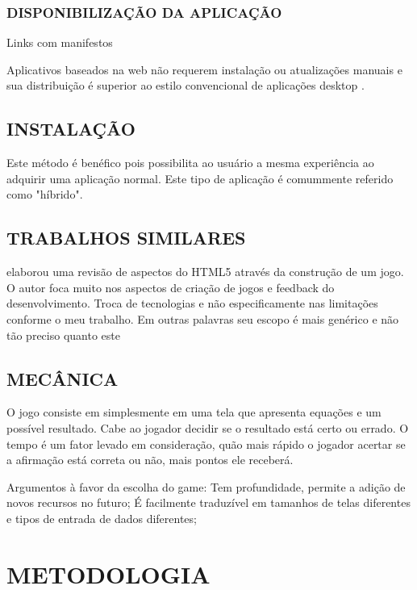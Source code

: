 \documentclass[
12pt,
a4paper,
portuges,
draft
]{report}
\begin{document}
\subsection{DISPONIBILIZAÇÃO DA APLICAÇÃO}

Links com manifestos

Aplicativos baseados na web não requerem instalação ou atualizações manuais e sua distribuição é superior ao estilo convencional de aplicações desktop \autocite{browserGamesTechnologyAndFuture}.

\section{INSTALAÇÃO}
Este método é benéfico pois possibilita ao usuário a mesma
experiência ao adquirir uma aplicação normal. Este tipo de
aplicação é comummente referido como "híbrido".

\section{TRABALHOS SIMILARES}

\cite{crossPlatformMobileGame} elaborou uma revisão de aspectos do
HTML5 através da construção de um jogo. O autor foca muito nos
aspectos de criação de jogos e feedback do desenvolvimento. Troca
de tecnologias e não especificamente nas limitações conforme o meu
trabalho. Em outras palavras seu escopo é mais genérico e não tão
preciso quanto este


\section{MECÂNICA}

O jogo consiste em simplesmente em uma tela que apresenta equações e
um possível resultado. Cabe ao jogador decidir se o resultado está
certo ou errado. O tempo é um fator levado em consideração, quão
mais rápido o jogador acertar se a afirmação está correta ou não,
mais pontos ele receberá.

Argumentos à favor da escolha do game: Tem profundidade, permite a
adição de novos recursos no futuro;
É facilmente traduzível em tamanhos de telas diferentes e tipos de
entrada de dados diferentes;

\chapter{METODOLOGIA}
\thispagestyle{myheadings}
\end{document}
